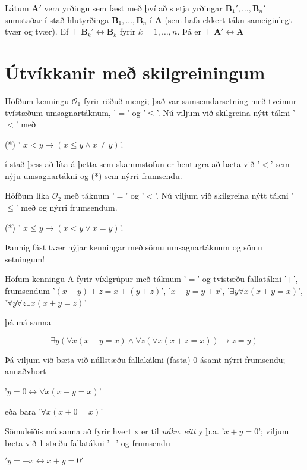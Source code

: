 \documentclass[12pt]{book}
\begin{document}
\begin{setn}[Jafngildisetning]
 Látum $ \mathbf{A}'$ vera yrðingu sem fæst með því að s etja yrðingar
 $\mathbf{B}_1', \dotsc, \mathbf{B}_n'$ sumstaðar í stað hlutyrðinga
 $\mathbf{B}_1, \dotsc, \mathbf{B}_n$ í $\mathbf{A}$ (sem hafa ekkert tákn
sameiginlegt tvær og tvær).
Ef $\vdash \mathbf{B}_k' \leftrightarrow \mathbf{B}_k$ fyrir
$k = 1, \dotsc, n$. Þá er $\vdash \mathbf{A}' \leftrightarrow \mathbf{A}$
\end{setn}


\section{Útvíkkanir með skilgreiningum}

Höfðum kenningu $\mathcal{O}_1$ fyrir röðuð mengi;
það var samsemdarsetning með tveimur tvístæðum umsagnartáknum,
'$=$' og '$\leq$'. Nú viljum við skilgreina nýtt tákni '$<$' með

(*) ' $ x < y \rightarrow (x \leq y \wedge x \neq y)$'.

í stað þess að líta á þetta sem skammstöfun er hentugra að bæta við
'$<$' sem nýju umsagnartákni og (*) sem nýrri frumsendu.

Höfðum líka $\mathcal{O}_2$ með táknum
'$=$' og '$<$'. Nú viljum við skilgreina nýtt tákni '$\leq$' með
og nýrri frumsendum.

(*) ' $ x \leq y \rightarrow (x < y \vee x = y)$'.

Þannig fást tvær nýjar kenningar með sömu umsagnartáknum og sömu setningum!

Höfum kenningu A fyrir víxlgrúpur með táknum '$=$' og tvístæðu fallatákni '$+$',
frumsendum
'$(x+y) + z = x + (y + z)$', '$x + y = y + x$',
'$ \exists y \forall x (x +y = x) $', '$\forall y \forall z \exists x (x + y = z)$'

þá má sanna

\[ \exists y ( \forall x (x+y = x) \wedge \forall z (\forall x (x+z = x)) \rightarrow z = y) \]

Þá viljum við bæta við núllstæðu fallakákni (fasta) 0 ásamt nýrri frumsendu;
annaðvhort

'$y = 0 \leftrightarrow \forall x ( x+y = x)$'

eða bara
'$\forall x (x + 0 = x)$'

Sömuleiðis má sanna að fyrir hvert x er til \emph{nákv. eitt} y þ.a.
'$x+y = 0$'; viljum bæta við 1-stæðu fallatákni '$-$' og frumsendu

$'y = -x \leftrightarrow x + y = 0'$
\end{document}
